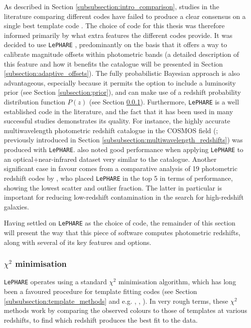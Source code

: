 As described in Section \ref{subsubsection:intro_comparison}, studies in the literature comparing different codes have failed to produce a clear consensus on a single best template code \citep{2010A&A...523A..31H,2011MNRAS.417.1891A,2013ApJ...775...93D}. The choice of code for this thesis was therefore informed primarily by what extra features the different codes provide. It was decided to use \texttt{LePHARE} \citep{2006A&A...457..841I,2009ApJ...690.1236I}, predominantly on the basis that it offers a way to calibrate magnitude offsets within photometric bands (a detailed description of this feature and how it benefits the \DESVIDEO catalogue will be presented in Section \ref{subsection:adaptive_offsets}). The fully probabilistic Bayesian approach is also advantageous, especially because it permits the option to include a luminosity prior (see Section \ref{subsection:prior}), and can make use of a redshift probability distribution function $P(z)$ (see Section \ref{subsubsection:chi_minimisation}). Furthermore, \texttt{LePHARE} is a well established code in the literature, and the fact that it has been used in many successful studies demonstrates its quality. For instance, the highly accurate multiwavelength photometric redshift catalogue in the COSMOS field (\citealt{2009ApJ...690.1236I}; previously introduced in Section \ref{subsubsection:multiwavelength_redshifts}) was produced with \texttt{LePHARE}. \cite{2013MNRAS.428.1281J} also noted good performance when applying \texttt{LePHARE} to an optical+near-infrared dataset very similar to the \DESVIDEO catalogue. Another significant case in favour comes from a comparative analysis of 19 photometric redshift codes by  \cite{2010A&A...523A..31H}, who placed \texttt{LePHARE} in the top 5 in terms of performance, showing the lowest scatter and outlier fraction. The latter in particular is important for reducing low-redshift contamination in the search for high-redshift galaxies. \par


Having settled on \texttt{LePHARE} as the choice of code, the remainder of this section will present the way that this piece of software computes photometric redshifts, along with several of its key features and options. \par




\subsubsection{\texorpdfstring{$\chi^2$}{TEXT} minimisation}\label{subsubsection:chi_minimisation}
\texttt{LePHARE} operates using a standard $\chi^2$ minimisation algorithm, which has long been a favoured procedure for template fitting codes (see Section \ref{subsubsection:template_methods} and e.g. \citealt{1982ApJ...257L..57P}, \citealt{2000A&A...363..476B}, \citealt{2008ApJ...686.1503B}). In very rough terms, these $\chi^2$ methods work by comparing the observed colours to those of templates at various redshifts, to find which redshift produces the best fit to the data. \par 

